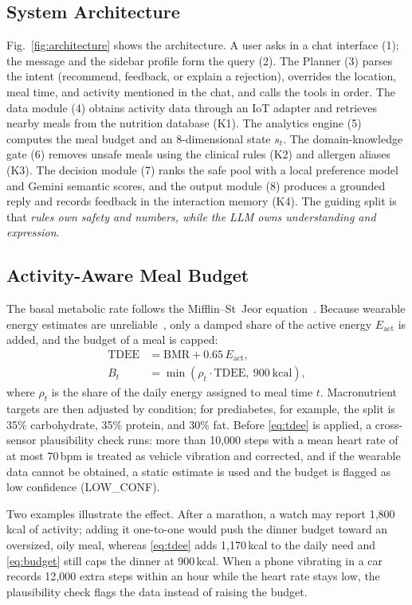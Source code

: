 \subsection{System Architecture}
Fig.~\ref{fig:architecture} shows the architecture. A user asks in a chat
interface (1); the message and the sidebar profile form the query (2). The
Planner (3) parses the intent (recommend, feedback, or explain a rejection),
overrides the location, meal time, and activity mentioned in the chat, and calls
the tools in order. The data module (4) obtains activity data through an IoT
adapter and retrieves nearby meals from the nutrition database (K1). The
analytics engine (5) computes the meal budget and an 8-dimensional state $s_t$.
The domain-knowledge gate (6) removes unsafe meals using the clinical rules (K2)
and allergen aliases (K3). The decision module (7) ranks the safe pool with a
local preference model and Gemini semantic scores, and the output module (8)
produces a grounded reply and records feedback in the interaction memory (K4).
The guiding split is that \emph{rules own safety and numbers, while the LLM
owns understanding and expression}.

\subsection{Activity-Aware Meal Budget}
The basal metabolic rate follows the Mifflin--St~Jeor
equation~\cite{mifflin1990bmr}. Because wearable energy estimates are
unreliable~\cite{germini2022wearable}, only a damped share of the active energy
$E_{\mathrm{act}}$ is added, and the budget of a meal is capped:
\begin{align}
    \mathrm{TDEE} &= \mathrm{BMR} + 0.65\,E_{\mathrm{act}}, \label{eq:tdee}\\
    B_t &= \min\!\left(\rho_t \cdot \mathrm{TDEE},\ 900\ \mathrm{kcal}\right),
    \label{eq:budget}
\end{align}
where $\rho_t$ is the share of the daily energy assigned to meal time $t$.
Macronutrient targets are then adjusted by condition; for prediabetes, for
example, the split is 35\% carbohydrate, 35\% protein, and 30\% fat.
Before \eqref{eq:tdee} is applied, a cross-sensor plausibility check runs: more
than 10{,}000 steps with a mean heart rate of at most 70\,bpm is treated as
vehicle vibration and corrected, and if the wearable data cannot be obtained, a
static estimate is used and the budget is flagged as low confidence
(LOW\_CONF).

Two examples illustrate the effect. After a marathon, a watch may report
1{,}800\,kcal of activity; adding it one-to-one would push the dinner budget
toward an oversized, oily meal, whereas \eqref{eq:tdee} adds 1{,}170\,kcal to
the daily need and \eqref{eq:budget} still caps the dinner at 900\,kcal. When a
phone vibrating in a car records 12{,}000 extra steps within an hour while the
heart rate stays low, the plausibility check flags the data instead of raising
the budget.

